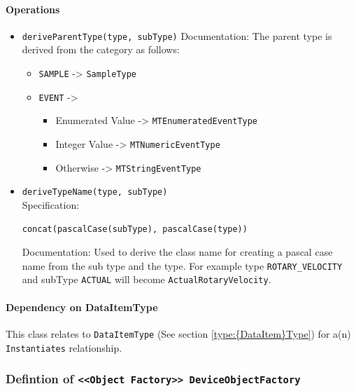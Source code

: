 \paragraph{Operations}
\begin{itemize}
  \item \texttt{deriveParentType(type, subType)}
    Documentation: The parent type is derived from the category as follows: 

\begin{itemize}
  \item \texttt{SAMPLE} -> \texttt{SampleType}
  \item \texttt{EVENT} ->
  \begin{itemize}
   \item Enumerated Value -> \texttt{MTEnumeratedEventType}
   \item Integer Value -> \texttt{MTNumericEventType}
   \item Otherwise -> \texttt{MTStringEventType}
  \end{itemize}
\end{itemize}

  \item \texttt{deriveTypeName(type, subType)}\\
    Specification:
   \indent \begin{lstlisting}
concat(pascalCase(subType), pascalCase(type))
\end{lstlisting}

    Documentation: Used to derive the class name for creating a pascal case name from the sub type and the type. 
For example type \texttt{ROTARY_VELOCITY} and subType \texttt{ACTUAL} will become \texttt{ActualRotaryVelocity}.

\end{itemize}
\paragraph{Dependency on {DataItem}Type}

This class relates to \texttt{{DataItem}Type} (See section \ref{type:{DataItem}Type}) for a(n) \texttt{Instantiates} relationship.

\FloatBarrier
\subsubsection{Defintion of \texttt{<<Object Factory>> DeviceObjectFactory}} \label{type:DeviceObjectFactory}

\FloatBarrier

